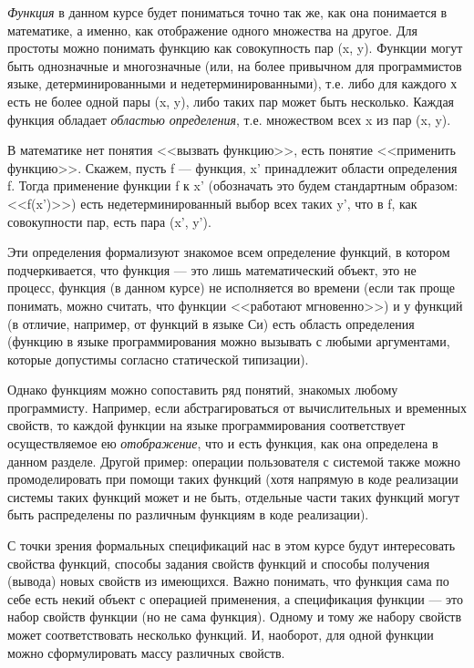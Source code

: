 
\emph{Функция} в данном курсе будет пониматься точно так же, как она понимается в математике, а именно, как отображение одного множества на другое. Для простоты можно понимать функцию как совокупность пар (x, y). Функции могут быть однозначные и многозначные (или, на более привычном для программистов языке, детерминированными и недетерминированными), т.е. либо для каждого х есть не более одной пары (x, y), либо таких пар может быть несколько. Каждая функция обладает \emph{областью определения}, т.е. множеством всех x из пар (x, y).

В математике нет понятия <<вызвать функцию>>, есть понятие <<применить функцию>>. Скажем, пусть f --- функция, x' принадлежит области определения f. Тогда применение функции f к x' (обозначать это будем стандартным образом: <<f(x')>>) есть недетерминированный выбор всех таких y', что в f, как совокупности пар, есть пара (x', y').

Эти определения формализуют знакомое всем определение функций, в котором подчеркивается, что функция --- это лишь математический объект, это не процесс, функция (в данном курсе) не исполняется во времени (если так проще понимать, можно считать, что функции <<работают мгновенно>>) и у функций (в отличие, например, от функций в языке Си) есть область определения (функцию в языке программирования можно вызывать с любыми аргументами, которые допустимы согласно статической типизации).

Однако функциям можно сопоставить ряд понятий, знакомых любому программисту. Например, если абстрагироваться от вычислительных и временных свойств, то каждой функции на языке программирования соответствует осуществляемое ею \emph{отображение}, что и есть функция, как она определена в данном разделе. Другой пример: операции пользователя с системой также можно промоделировать при помощи таких функций (хотя напрямую в коде реализации системы таких функций может и не быть, отдельные части таких функций могут быть распределены по различным функциям в коде реализации).

С точки зрения формальных спецификаций нас в этом курсе будут интересовать свойства функций, способы задания свойств функций и способы получения (вывода) новых свойств из имеющихся. Важно понимать, что функция сама по себе есть некий объект с операцией применения, а спецификация функции --- это набор свойств функции (но не сама функция). Одному и тому же набору свойств может соответствовать несколько функций. И, наоборот, для одной функции можно сформулировать массу различных свойств.

